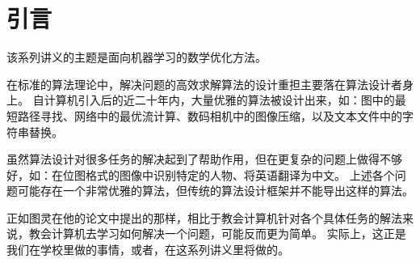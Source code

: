 
\chapter{
    引言
    }  \label{chap:intro}


该系列讲义的主题是面向机器学习的数学优化方法。

在标准的算法理论中，解决问题的高效求解算法的设计重担主要落在算法设计者身上。
自计算机引入后的近二十年内，大量优雅的算法被设计出来，如：图中的最短路径寻找、网络中的最优流计算、数码相机中的图像压缩，以及文本文件中的字符串替换。

虽然算法设计对很多任务的解决起到了帮助作用，但在更复杂的问题上做得不够好，如：在位图格式的图像中识别特定的人物、将英语翻译为中文。
上述各个问题可能存在一个非常优雅的算法，但传统的算法设计框架并不能导出这样的算法。

正如图灵在他的论文\cite{turing}中提出的那样，相比于教会计算机针对各个具体任务的解法来说，教会计算机去学习如何解决一个问题，可能反而更为简单。
实际上，这正是我们在学校里做的事情，或者，在这系列讲义里将做的。

